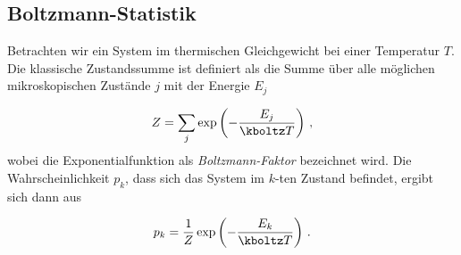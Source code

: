 \subsection*{Boltzmann-Statistik}

Betrachten wir ein System im thermischen Gleichgewicht bei einer Temperatur $T$. Die klassische Zustandssumme ist definiert als die Summe über alle möglichen mikroskopischen Zustände $j$ mit der Energie $E_j$

\begin{equation*}\label{eq:ideal-nr}
  Z=\sum_j \exp \left(-\frac{E_j}{\kboltz T}\right)\,,
\end{equation*}
%
wobei die Exponentialfunktion als \emph{Boltzmann-Faktor} bezeichnet wird. Die Wahrscheinlichkeit $p_k$, dass sich das System im $k$-ten Zustand befindet, ergibt sich dann aus

\begin{equation*}\label{eq:ideal-nr}
  p_k=\frac{1}{Z} \exp \left(-\frac{E_k}{\kboltz T}\right)\,.
\end{equation*}
